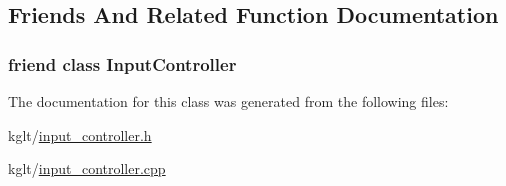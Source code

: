 \subsection{Friends And Related Function Documentation}
\hypertarget{classkglt_1_1_keyboard_a083d5a8d8c2dd3a28d1f55d2965db0ab}{
\subsubsection[{Input\-Controller}]{\setlength{\rightskip}{0pt plus 5cm}friend class {\bf Input\-Controller}\hspace{0.3cm}{\ttfamily [friend]}}}\label{classkglt_1_1_keyboard_a083d5a8d8c2dd3a28d1f55d2965db0ab}


The documentation for this class was generated from the following files\-:\begin{DoxyCompactItemize}
\item 
kglt/\hyperlink{input__controller_8h}{input\-\_\-controller.\-h}\item 
kglt/\hyperlink{input__controller_8cpp}{input\-\_\-controller.\-cpp}\end{DoxyCompactItemize}
